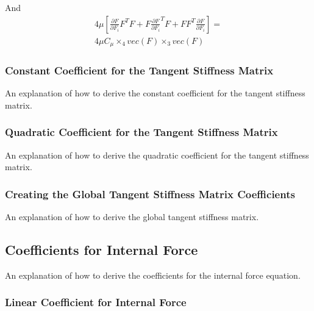 \documentclass[twocolumn,10pt]{asme2ej}
\begin{document}
And
\begin{equation}
\begin{split}
4\mu[\frac{\partial F}{\partial F_i}F^TF + F\frac{\partial F}{\partial F_i}^TF + FF^T\frac{\partial F}{\partial F_i}] =
\\ 4\mu C_{\mu} \times_4 vec(F) \times_3 vec(F)
\end{split}
\end{equation}

\subsubsection{Constant Coefficient for the Tangent Stiffness Matrix}

An explanation of how to derive the constant coefficient for the tangent stiffness matrix.

\subsubsection{Quadratic Coefficient for the Tangent Stiffness Matrix}

An explanation of how to derive the quadratic coefficient for the tangent stiffness matrix.

\subsubsection{Creating the Global Tangent Stiffness Matrix Coefficients}

An explanation of how to derive the global tangent stiffness matrix.

\subsection{Coefficients for Internal Force}

An explanation of how to derive the coefficients for the internal force equation.

\subsubsection{Linear Coefficient for Internal Force}
\end{document}
